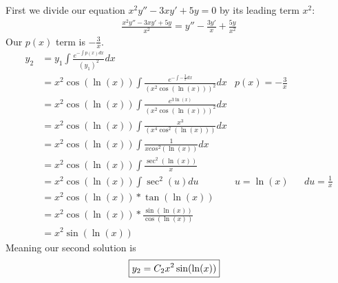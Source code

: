 \documentclass{article}
\begin{document}
First we divide our equation $x^2y'' - 3xy' + 5y = 0$ by its leading term $x^2$:  
\setcounter{equation}{0}
\begin{align*}
    \frac{x^2y'' - 3xy' + 5y}{x^2} = y'' - \frac{3y'}{x} + \frac{5y}{x^2}
\end{align*}
Our $p (x) $ term is $-\frac{3}{x}$.
\begin{align}
    y_2 &= y_1\int \frac{e^{- \int p(x)dx}}{(y_1)^2}dx \\ 
    &  = x^2 \cos(\ln(x)) \int \frac{e^{- \int -\frac{3}{x}dx}}{(x^2 \cos(\ln(x)))^2}dx & p(x) = - \frac{3}{x}  \\
    & = x^2 \cos(\ln(x)) \int \frac{e^{3\ln(x)}}{(x^2 \cos(\ln(x)))^2}dx \\
    & = x^2 \cos(\ln(x)) \int \frac{x^3}{(x^4 \cos^2(\ln(x)))}dx \\
    & = x^2 \cos(\ln(x)) \int \frac{1}{xcos^2(\ln(x))}dx \\
    & = x^2 \cos(\ln(x)) \int \frac{\sec^2(\ln(x))}{x} \\
    & = x^2 \cos(\ln(x)) \int {\sec^2(u)}du & u = \ln(x) && du = \frac{1}{x}\\
    & = x^2 \cos(\ln(x)) * \tan(\ln(x))\\
    & = x^2 \cos(\ln(x)) * \frac{\sin(\ln(x))}{\cos(\ln(x))} \\
    & = x^2 \sin(\ln(x))
\end{align}
Meaning our second solution is
\begin{align*}
    \Aboxed{y_2 = C_2x^2 \sin(\ln(x))}
\end{align*}
\end{document}
